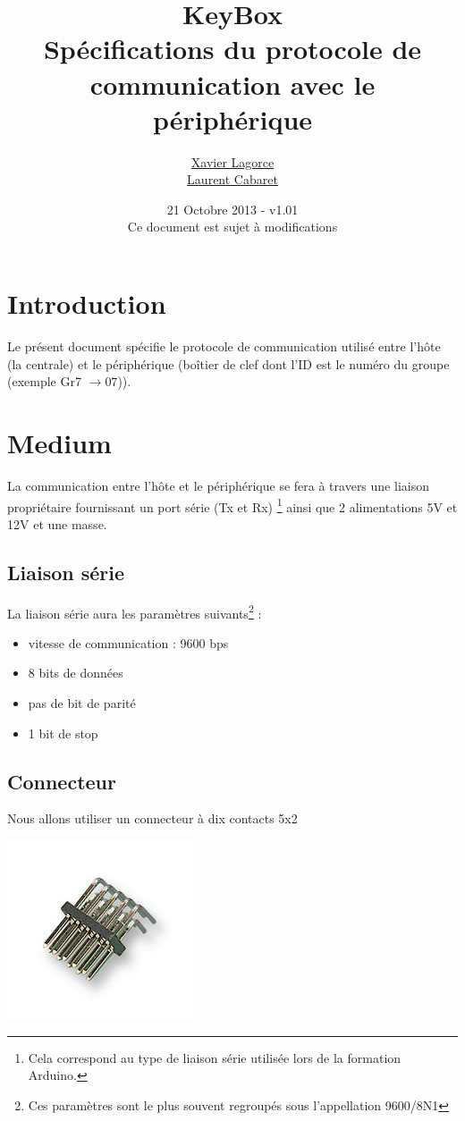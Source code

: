 \documentclass[a4paper, 10pt]{article} %
\title{{\huge KeyBox}\vspace{0.5cm}\\Spécifications du protocole de communication avec le périphérique}
\author{\href{mailto:Xavier.Lagorce@crans.org}{Xavier Lagorce}\\\href{mailto:laurent.cabaret@ecp.fr}{Laurent Cabaret}}
\date{21 Octobre 2013 - v1.01\\Ce document est sujet à modifications}
\newcommand{\saut}{\vspace{0.5cm}}
\begin{document}
\maketitle

\vspace{1cm}

\tableofcontents
\newpage

\section{Introduction}

Le présent document spécifie le protocole de communication utilisé entre l'hôte (la centrale)
et le périphérique (boîtier de clef dont l'ID est le numéro du groupe (exemple Gr7 $\longrightarrow 07$)).

\section{Medium}

La communication entre l'hôte et le périphérique se fera à travers une liaison propriétaire fournissant un port série (Tx et Rx) \footnote{Cela correspond au type de liaison série utilisée lors de la formation Arduino.} ainsi que 2 alimentations 5V et 12V et une masse.

\saut

\subsection{Liaison série}
La liaison série aura les paramètres suivants\footnote{Ces paramètres sont le plus souvent regroupés
sous l'appellation 9600/8N1} :
\begin{itemize}
  \item vitesse de communication : 9600 bps
  \item 8 bits de données
  \item pas de bit de parité
  \item 1 bit de stop
\end{itemize}

\subsection{Connecteur}

Nous allons utiliser un connecteur à dix contacts 5x2 

\begin{center}
\includegraphics[scale=0.5]{HE10.jpg}
\end{center}
\end{document}
